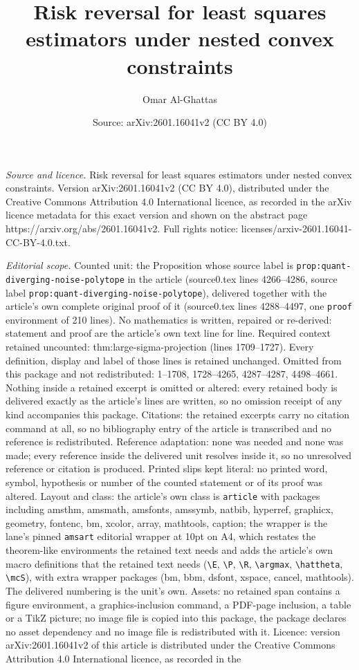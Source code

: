 \documentclass[10pt,a4paper]{amsart}
\title[Risk reversal for least squares estimators under nested conv]{Risk reversal for least squares estimators under nested convex constraints}
\author{Omar Al-Ghattas}
\date{Source: arXiv:2601.16041v2 (CC BY 4.0)}
\begin{document}
\maketitle

\noindent\emph{Source and licence.} Risk reversal for least squares estimators under nested convex constraints. Version arXiv:2601.16041v2 (CC BY 4.0), distributed under the Creative Commons Attribution 4.0 International licence, as recorded in the arXiv licence metadata for this exact version and shown on the abstract page https://arxiv.org/abs/2601.16041v2. Full rights notice: licenses/arxiv-2601.16041-CC-BY-4.0.txt.\par\smallskip

\noindent\textit{Editorial scope.} Counted unit: the Proposition whose source label is \texttt{prop:quant-diverging-noise-polytope} in the article (source0.tex lines 4266--4286, source label \texttt{prop:quant-diverging-noise-polytope}), delivered together with the article's own complete original proof of it (source0.tex lines 4288--4497, one \texttt{proof} environment of 210 lines). No mathematics is written, repaired or re-derived: statement and proof are the article's own text line for line. Required context retained uncounted: thm:large-sigma-projection (lines 1709--1727). Every definition, display and label of those lines is retained unchanged. Omitted from this package and not redistributed: 1--1708, 1728--4265, 4287--4287, 4498--4661. Nothing inside a retained excerpt is omitted or altered: every retained body is delivered exactly as the article's lines are written, so no omission receipt of any kind accompanies this package. Citations: the retained excerpts carry no citation command at all, so no bibliography entry of the article is transcribed and no reference is redistributed. Reference adaptation: none was needed and none was made; every reference inside the delivered unit resolves inside it, so no unresolved reference or citation is produced. Printed slips kept literal: no printed word, symbol, hypothesis or number of the counted statement or of its proof was altered. Layout and class: the article's own class is \texttt{article} with packages including amsthm, amsmath, amsfonts, amssymb, natbib, hyperref, graphicx, geometry, fontenc, bm, xcolor, array, mathtools, caption; the wrapper is the lane's pinned \texttt{amsart} editorial wrapper at 10pt on A4, which restates the theorem-like environments the retained text needs and adds the article's own macro definitions that the retained text needs (\texttt{\textbackslash E}, \texttt{\textbackslash P}, \texttt{\textbackslash R}, \texttt{\textbackslash argmax}, \texttt{\textbackslash hattheta}, \texttt{\textbackslash mcS}), with extra wrapper packages (bm, bbm, dsfont, xspace, cancel, mathtools). The delivered numbering is the unit's own. Assets: no retained span contains a figure environment, a graphics-inclusion command, a PDF-page inclusion, a table or a TikZ picture; no image file is copied into this package, the package declares no asset dependency and no image file is redistributed with it. Licence: version arXiv:2601.16041v2 of this article is distributed under the Creative Commons Attribution 4.0 International licence, as recorded in the 
\end{document}
